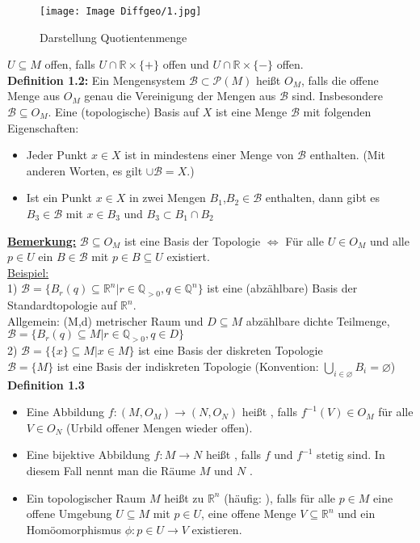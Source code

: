 \documentclass[fleqn, 12pt, letterpaper]{article}
\begin{document}
\begin{figure}[H]
    \centering
    \texttt{[image: Image Diffgeo/1.jpg]}
	\caption{Darstellung Quotientenmenge}
 \end{figure}
$U\subseteq M$ offen, falls $U\cap \mathbb{R}\times\{+\}$ offen und $U\cap \mathbb{R}\times\{-\}$ offen.\\

\textbf{Definition 1.2:} Ein Mengensystem $\mathcal{B} \subset \mathcal{P} (M)$ heißt  $O_M$, falls die offene Menge aus $O_M$ genau die Vereinigung der Mengen aus $\mathcal{B}$ sind. Insbesondere $\mathcal{B}\subseteq O_M$. Eine (topologische) Basis auf $X$ ist eine Menge $\mathcal{B}$ mit folgenden Eigenschaften:
\begin{itemize}
  \item Jeder Punkt $x\in X$ ist in mindestens einer Menge von $\mathcal{B}$ enthalten. (Mit anderen Worten, es gilt $\cup \mathcal{B}=X$.)
  \item Ist ein Punkt $x\in X$ in zwei Mengen $B_1$,$B_2\in \mathcal{B}$ enthalten, dann gibt es $B_3\in \mathcal{B}$ mit $x\in B_3$ und $B_3\subset B_1\cap B_2$
\end{itemize}

\underline{\textbf{Bemerkung:}} $\mathcal{B}\subseteq O_M$ ist eine Basis der Topologie $\Leftrightarrow$ Für alle $U\in O_M$ und alle $p\in U$ ein $B\in \mathcal{B}$ mit $p\in B\subseteq U$ existiert.\\

\underline{Beispiel:}\\

1) $\mathcal{B}=\{B_r(q)\subseteq \mathbb{R}^n|r\in \mathbb{Q}_{>0}, q\in\mathbb{Q}^n\}$ ist eine (abzählbare) Basis der Standardtopologie auf $\mathbb{R}^n$.\\
Allgemein: (M,d) metrischer Raum und $D\subseteq M$ abzählbare dichte Teilmenge, $\mathcal{B}=\{B_r(q)\subseteq M|r\in \mathbb{Q}_{>0}, q\in D\}$\\

2) $\mathcal{B}=\{\{x\}\subseteq M|x\in M\}$ ist eine Basis der diskreten Topologie\\
$\mathcal{B}=\{M\}$ ist eine Basis der indiskreten Topologie (Konvention: $\bigcup_{i\in \varnothing }B_i=\varnothing $)\\

\textbf{Definition 1.3}\begin{itemize}
	\item Eine Abbildung $f:(M, O_M)\rightarrow (N, O_N)$ heißt , falls $f^{-1}(V)\in O_M$ für alle $V\in O_N$ (Urbild offener Mengen wieder offen).
	\item Eine bijektive Abbildung $f:M\rightarrow N$ heißt , falls $f$ und $f^{-1}$ stetig sind. In diesem Fall nennt man die Räume $M$ und $N$ .
	\item Ein topologischer Raum $M$ heißt  zu $\mathbb{R}^n$ (häufig: ), falls für alle $p\in M$ eine offene Umgebung $U\subseteq M$ mit $p\in U$, eine offene Menge $V\subseteq \mathbb{R}^n$ und ein Homöomorphismus $\phi:p\in U\rightarrow V$ existieren.
\end{itemize}
\end{document}
